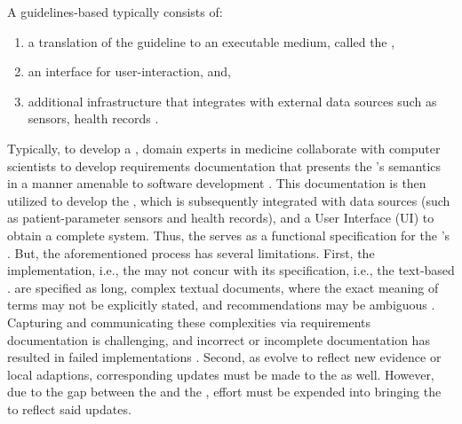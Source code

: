 A guidelines-based \CDSS{} typically consists of:
\begin{enumerate}
  \item a translation of the guideline to an executable medium, called the
  \BPGLogic{},
  \item an interface for user-interaction, and,
  \item additional infrastructure that integrates with external data sources
  such as sensors, health records \cite{SuttonNature20}.
\end{enumerate}
Typically, to develop a \CDSS{}, domain experts in medicine
collaborate with computer scientists to develop requirements documentation
that presents the \BPGs{}'s
semantics in a manner amenable to software development \cite{PelegJBI13}.
This documentation is then utilized to develop the \BPGLogic{}, which is subsequently integrated with data sources (such as patient-parameter sensors and health records),
and a User Interface (UI) to obtain a complete system. Thus, the \BPG{}
serves as a functional specification for the \CDSS{}'s \BPGLogic{}.
But, the aforementioned process has several limitations.
First, the implementation, i.e., the \BPGLogic{} may not concur with its specification,
i.e., the text-based \BPG{}. \BPGs{} are specified as long, complex textual documents,
where the exact meaning of terms may not be explicitly stated, and recommendations may be ambiguous \cite{ClerqAIM03}.
Capturing and communicating these complexities via requirements documentation
is challenging, and incorrect or incomplete documentation has resulted in failed
implementations \cite{KubbenBook19}. Second, as \BPGs{} evolve to reflect
new evidence or local adaptions, corresponding updates must be made to the
\CDSS{} as well. However, due to the gap between the \BPG{} and the \BPGLogic{},
effort must be expended into bringing the \BPGLogic{} to reflect said updates.

